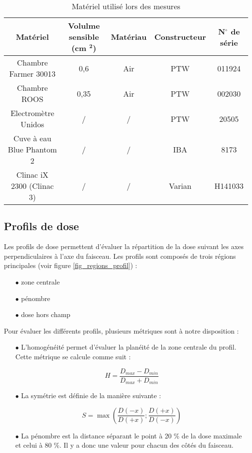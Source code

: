 \documentclass{article}
\begin{document}
\begin{table}[h]
  \centering
  \begin{tabular}{ccccc}
    \toprule
    \textbf{Matériel} & \textbf{Volulme sensible (cm} $\mathbf{^2}$\textbf{)} & Matériau & \textbf{Constructeur} & \textbf{N$^{\circ}$ de série}\\
    \toprule
    Chambre Farmer 30013 & 0,6 & Air & PTW & 011924 \\
    Chambre ROOS & 0,35 & Air & PTW & 002030 \\
    Electromètre Unidos & / & / & PTW & 20505 \\
    Cuve à eau Blue Phantom 2 & / & / & IBA & 8173 \\
    Clinac iX 2300 (Clinac 3) & / & / & Varian & H141033 \\
    \bottomrule
  \end{tabular}
  \caption{Matériel utilisé lors des mesures}
  \label{table_matos}
\end{table}



\subsection{Profils de dose}

Les profils de dose permettent d'évaluer la répartition de la dose suivant les axes perpendiculaires à l'axe du faisceau. Les profils sont composés de trois régions principales (voir figure \ref*{fig_regions_profil}) :

\begin{itemize}
  \item[$\bullet$] zone centrale
  \item[$\bullet$] pénombre
  \item[$\bullet$] dose hors champ
\end{itemize}

Pour évaluer les différents profils, plusieurs métriques sont à notre disposition :

\begin{itemize}
  \item[$\bullet$] L'homogénéité permet d'évaluer la planéité de la zone centrale du profil. Cette métrique se calcule comme suit :
  
  \begin{equation}
    H = \dfrac{D_{max} - D_{min}}{D_{max} + D_{min}}
    \label{eq_homogeneite}
  \end{equation}
  
  \item[$\bullet$] La symétrie est définie de la manière suivante :
  
  \begin{equation}
    S = \max\left(\dfrac{D(-x)}{D(+x)}; \dfrac{D(+x)}{D(-x)}\right)
    \label{eq_symetrie}
  \end{equation}
  
  \item[$\bullet$] La pénombre est la distance séparant le point à 20 \% de la dose maximale et celui à 80 \%. Il y a donc une valeur pour chacun des côtés du faisceau.  
\end{itemize}
\end{document}
